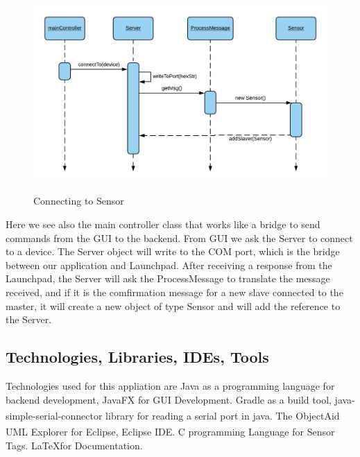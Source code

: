 \documentclass[hidelinks,conference,12pt]{IEEETran}
\begin{document}
\FloatBarrier
\begin{figure}[!h]
	\centering
	\caption{Connecting to Sensor}
	\includegraphics[scale=0.5]{images/Seq_Slav_Conn.png}
	\label{img:slav}
\end{figure}
\FloatBarrier
Here we see also the main controller class that works like a bridge to send commands from the GUI to the backend. From GUI we ask the Server to connect to a device. The Server object will write to the COM port, which is the bridge between our application and Launchpad. After receiving a response from the Launchpad, the Server will ask the ProcessMessage to translate the message received, and if it is the comfirmation message for a new slave connected to the master, it will create a new object of type Sensor and will add the reference to the Server.

\subsection{Technologies, Libraries, IDEs, Tools}
Technologies used for this appliation are Java as a programming language for backend development, JavaFX for GUI Development. Gradle as a build tool, java-simple-serial-connector\textsuperscript{\cite{javasimpconn}} library for reading  a serial port in java. The ObjectAid UML Explorer for Eclipse\textsuperscript{\cite{ojectaid}}, Eclipse IDE. C programming Language for Sensor Tags. \LaTeX \space for Documentation.
\end{document}
